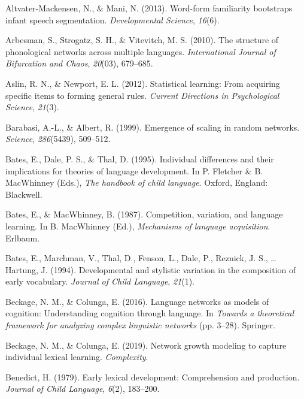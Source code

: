 \documentclass[english,,man,floatsintext]{apa6}
\begin{document}
\leavevmode\hypertarget{ref-altvater2013}{}%
Altvater-Mackensen, N., \& Mani, N. (2013). Word-form familiarity bootstraps infant speech segmentation. \emph{Developmental Science}, \emph{16}(6).

\leavevmode\hypertarget{ref-arbesman2010}{}%
Arbesman, S., Strogatz, S. H., \& Vitevitch, M. S. (2010). The structure of phonological networks across multiple languages. \emph{International Journal of Bifurcation and Chaos}, \emph{20}(03), 679--685.

\leavevmode\hypertarget{ref-aslin2012}{}%
Aslin, R. N., \& Newport, E. L. (2012). Statistical learning: From acquiring specific items to forming general rules. \emph{Current Directions in Psychological Science}, \emph{21}(3).

\leavevmode\hypertarget{ref-barabasi99}{}%
Barabasi, A.-L., \& Albert, R. (1999). Emergence of scaling in random networks. \emph{Science}, \emph{286}(5439), 509--512.

\leavevmode\hypertarget{ref-bates1995}{}%
Bates, E., Dale, P. S., \& Thal, D. (1995). Individual differences and their implications for theories of language development. In P. Fletcher \& B. MacWhinney (Eds.), \emph{The handbook of child language}. Oxford, England: Blackwell.

\leavevmode\hypertarget{ref-bates1987}{}%
Bates, E., \& MacWhinney, B. (1987). Competition, variation, and language learning. In B. MacWhinney (Ed.), \emph{Mechanisms of language acquisition}. Erlbaum.

\leavevmode\hypertarget{ref-bates1994}{}%
Bates, E., Marchman, V., Thal, D., Fenson, L., Dale, P., Reznick, J. S., \ldots{} Hartung, J. (1994). Developmental and stylistic variation in the composition of early vocabulary. \emph{Journal of Child Language}, \emph{21}(1).

\leavevmode\hypertarget{ref-beckage2016}{}%
Beckage, N. M., \& Colunga, E. (2016). Language networks as models of cognition: Understanding cognition through language. In \emph{Towards a theoretical framework for analyzing complex linguistic networks} (pp. 3--28). Springer.

\leavevmode\hypertarget{ref-beckage2019}{}%
Beckage, N. M., \& Colunga, E. (2019). Network growth modeling to capture individual lexical learning. \emph{Complexity}.

\leavevmode\hypertarget{ref-benedict1979}{}%
Benedict, H. (1979). Early lexical development: Comprehension and production. \emph{Journal of Child Language}, \emph{6}(2), 183--200.
\end{document}
